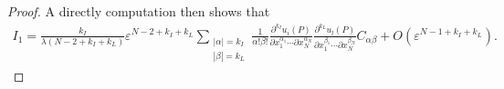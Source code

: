 \documentclass[11pt,reqno]{article}
\numberwithin{equation}{section}
\newcommand\e\varepsilon
\newcommand\la\lambda
\begin{document}
\begin{proof}
        A  directly computation then shows that  
        \begin{equation}\label{eq05112025-1}
        \begin{aligned}
           I_1= \frac{ k_I}{\lambda(N-2+k_I+k_L)}\e^{N-2+k_I+k_L}\sum_{\substack{|\alpha|={ k_I}\\
           |\beta|={ k_L}}}\frac{1}{\alpha!\beta!}\frac{\partial^{{ k_I}} u_i (P)}{\partial x_{1}^{\alpha_1}\cdots\partial x_{N}^{\alpha_N}}\frac{\partial^{{ k_L}} u_l (P)}{\partial x_{1}^{\beta_1}\cdots\partial x_{N}^{\beta_N}} C_{\alpha\beta}+O(\e^{N-1+{ k_I}+{ k_L}}).
            \end{aligned}
        \end{equation}
        

\end{proof}
\end{document}
